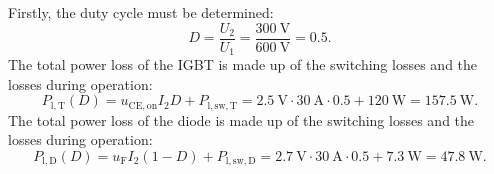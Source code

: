 \begin{solutionblock}
	Firstly, the duty cycle must be determined:
	\begin{equation}
		D = \frac{U_\mathrm{2}}{U_\mathrm{1}} = \frac{\SI{300}{\volt}}{\SI{600}{\volt}} = 0.5.
	\end{equation}
	The total power loss of the IGBT is made up of the switching losses and the losses during operation:
	\begin{equation}
		P_{\mathrm{l,T}}(D) = u_{\mathrm{CE,on}} I_\mathrm{2} D +  P_{\mathrm{l,sw,T}} = \SI{2.5}{\volt} \cdot \SI{30}{\ampere} \cdot 0.5 + \SI{120}{\watt} = \SI{157.5}{\watt}.
	\end{equation}
	The total power loss of the diode is made up of the switching losses and the losses during operation:
	\begin{equation}
		P_{\mathrm{l,D}}(D) = u_{\mathrm{F}} I_\mathrm{2} (1-D) +  P_{\mathrm{l,sw,D}} = \SI{2.7}{\volt} \cdot \SI{30}{\ampere} \cdot 0.5 + \SI{7.3}{\watt} = \SI{47.8}{\watt}.
	\end{equation}
\end{solutionblock}
